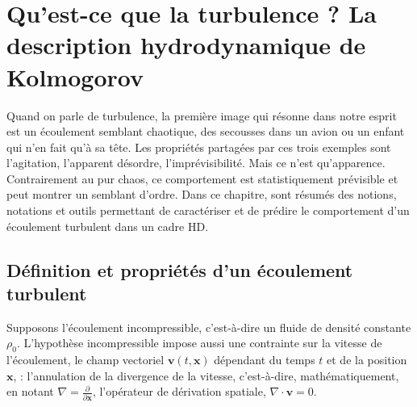 \chapter{Qu'est-ce que la turbulence ? La description hydrodynamique de Kolmogorov}
\renewcommand\partie{\Partie\ Chapitre \thechapter}
\label{ch-01}

\minitoc  

\bigskip


Quand on parle de turbulence, la première image qui résonne dans notre esprit est un écoulement semblant chaotique, des secousses dans un avion ou un enfant qui n'en fait qu'à sa tête. Les propriétés partagées par ces trois exemples sont l'agitation, l'apparent désordre, l'imprévisibilité. Mais ce n'est qu'apparence. Contrairement au pur chaos, ce comportement est statistiquement prévisible et peut montrer un semblant d'ordre. Dans ce chapitre, sont résumés des notions, notations et outils permettant de caractériser et de prédire le comportement d'un écoulement turbulent dans un cadre \ac{HD}. 

\section{Définition et propriétés d'un écoulement turbulent}\label{sec-011}

Supposons l'écoulement incompressible, c'est-à-dire un fluide de densité constante $\rho_0$. L'hypothèse incompressible impose aussi une contrainte sur la vitesse de l'écoulement, le champ vectoriel $\boldsymbol{v}(t,\mathbf{x})$ dépendant du temps $t$ et de la position $\mathbf{x}$, : l'annulation de la divergence de la vitesse, c'est-à-dire, mathématiquement, en notant $\nabla = \frac{\partial}{\partial \mathbf{x}}$, l'opérateur de dérivation spatiale, $\nabla \cdot \boldsymbol{v} = 0$.

